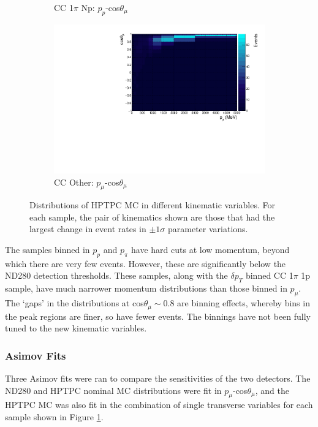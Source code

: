 \begin{figure}
\begin{subfigure}{.49\textwidth}
  \caption{CC 1$\pi$ Np: $p_{p}$-cos$\theta_{\mu}$}
\end{subfigure}
\begin{subfigure}{.49\textwidth}
  \centering
  \includegraphics[width=0.9\linewidth]{figs/hptpc_sigvar_ccOther.pdf}
  \caption{CC Other: $p_{\mu}$-cos$\theta_{\mu}$}
\end{subfigure}
\caption{Distributions of HPTPC MC in different kinematic variables. For each sample, the pair of kinematics shown are those that had the largest change in event rates in $\pm1\sigma$ parameter variations.}
\label{fig:hptpcsigvar}
\end{figure}

The samples binned in $p_{p}$ and $p_{\pi}$ have hard cuts at low momentum, beyond which there are very few events. However, these are significantly below the ND280 detection thresholds. These samples, along with the $\delta p_{T}$ binned CC 1$\pi$ 1p  sample, have much narrower momentum distributions than those binned in $p_{\mu}$. The `gaps' in the distributions at cos$\theta_{\mu}\sim$0.8 are binning effects, whereby bins in the peak regions are finer, so have fewer events. The binnings have not been fully tuned to the new kinematic variables. 

\subsubsection{Asimov Fits}

Three Asimov fits were ran to compare the sensitivities of the two detectors. The ND280 and HPTPC nominal MC distributions were fit in $p_{\mu}$-cos$\theta_{\mu}$, and the HPTPC MC was also fit in the combination of single transverse variables for each sample shown in Figure \ref{fig:hptpcsigvar}.

